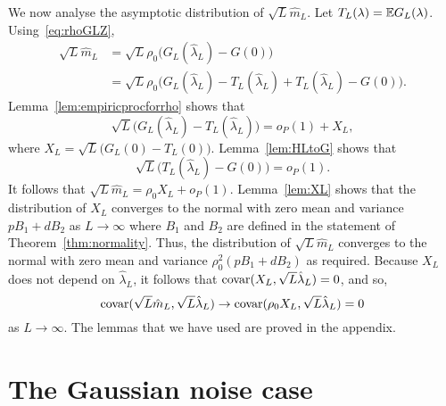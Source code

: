 \documentclass[draftcls, onecolumn, 11pt]{IEEEtran}
\begin{document}
We now analyse the asymptotic distribution of $\sqrt{L} \hat{m}_L$.  Let $T_L(\lambda) = {\mathbb E} G_L(\lambda)$.  Using~\eqref{eq:rhoGLZ},
\begin{align*}
\sqrt{L} \hat{m}_L &= \sqrt{L} \rho_0 \big( G_L(\hat{\lambda}_L) - G(0) \big) \\
&= \sqrt{L} \rho_0 \big( G_L(\hat{\lambda}_L) - T_L(\hat{\lambda}_L) + T_L(\hat{\lambda}_L) - G(0) \big).
\end{align*}
Lemma~\ref{lem:empiricprocforrho} shows that 
\[
\sqrt{L}\big( G_L(\hat{\lambda}_L) - T_L(\hat{\lambda}_L)  \big) = o_P(1) + X_L,
\]
where $X_L = \sqrt{L}\big( G_L(0) - T_L(0)  \big)$.  Lemma~\ref{lem:HLtoG} shows that
\[
\sqrt{L}\big( T_L(\hat{\lambda}_L) - G(0) \big) = o_P(1).
\]
It follows that $\sqrt{L} \hat{m}_L =  \rho_0 X_L + o_P(1)$.  Lemma~\ref{lem:XL} shows that the distribution of $X_L$ converges to the normal with zero mean and variance $p B_1 + d B_2$ as $L\rightarrow\infty$ where $B_1$ and $B_2$ are defined in the statement of Theorem~\ref{thm:normality}.  Thus, the distribution of $\sqrt{L} \hat{m}_L$ converges to the normal with zero mean and variance $\rho_0^2(p B_1 + d B_2)$ as required.  Because $X_L$ does not depend on $\hat{\lambda}_L$, it follows that $\operatorname{covar}(X_L, \sqrt{L}\hat{\lambda}_L) = 0$, and so,
\[
\operatorname{covar}(\sqrt{L}\hat{m}_L, \sqrt{L}\hat{\lambda}_L) \rightarrow \operatorname{covar}(\rho_0 X_L, \sqrt{L}\hat{\lambda}_L) = 0
\]
as $L \rightarrow \infty$.  The lemmas that we have used are proved in the appendix.



\section{The Gaussian noise case}\label{sec:gaussian-noise-case}
\end{document}
